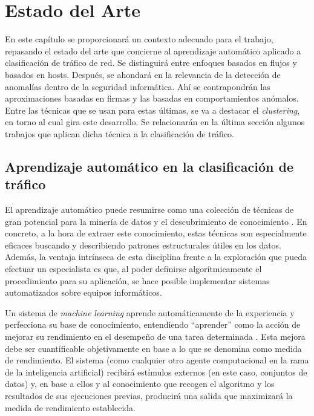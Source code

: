 \chapter{Estado del Arte}\label{chap:estadodelarte}

En este capítulo se proporcionará un contexto adecuado para el trabajo, repasando el estado del arte que concierne al aprendizaje automático aplicado a clasificación de tráfico de red.
Se distinguirá entre enfoques basados en flujos y basados en hosts.
Después, se ahondará en la relevancia de la detección de anomalías dentro de la seguridad informática.
Ahí se contrapondrán las aproximaciones basadas en firmas y las basadas en comportamientos anómalos.
Entre las técnicas que se usan para estas últimas, se va a destacar el \emph{clustering}, en torno al cual gira este desarrollo.
Se relacionarán en la última sección algunos trabajos que aplican dicha técnica a la clasificación de tráfico.

\section{Aprendizaje automático en la clasificación de tráfico}\label{sec:aprendizajeautomaticoenclasiftrafico}

El aprendizaje automático puede resumirse como una colección de técnicas de gran potencial para la minería de datos y el descubrimiento de conocimiento \cite{NA08}.
En concreto, a la hora de extraer este conocimiento, estas técnicas son especialmente eficaces buscando y describiendo patrones estructurales útiles en los datos.
Además, la ventaja intrínseca de esta disciplina frente a la exploración que pueda efectuar un especialista es que, al poder definirse algorítmicamente el procedimiento para su aplicación, se hace posible implementar sistemas automatizados sobre equipos informáticos.

Un sistema de \emph{machine learning} aprende automáticamente de la experiencia y perfecciona su base de conocimiento, entendiendo ``aprender'' como la acción de mejorar su rendimiento en el desempeño de una tarea determinada \cite{Simon_1983}.
Esta mejora debe ser cuantificable objetivamente en base a lo que se denomina como medida de rendimiento.
El sistema (como cualquier otro agente computacional en la rama de la inteligencia artificial) recibirá estímulos externos (en este caso, conjuntos de datos) y,
en base a ellos y al conocimiento que recogen el algoritmo y los resultados de sus ejecuciones previas, producirá una salida que maximizará la medida de rendimiento establecida.

